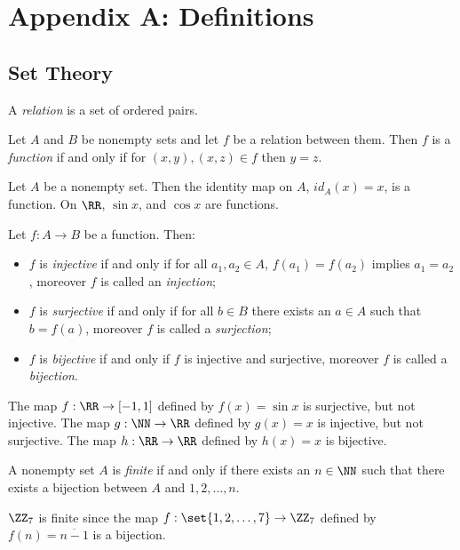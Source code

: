 
\chapter*{Appendix A: Definitions}

\section*{Set Theory}

\begin{definition*}
	A \textit{relation} is a set of ordered pairs.
\end{definition*}

\begin{definition*}
	Let $A$ and $B$ be nonempty sets and let $f$ be a relation between them. 
	Then $f$ is a \textit{function} if and only if for $(x,y),(x,z)\in f$ then $y=z$.
\end{definition*}
\begin{example*}
	Let $A$ be a nonempty set. 
	Then the identity map on $A$, $id_A(x)=x$, is a function.
	On $\RR$, $\sin x$, and $\cos x$ are functions.
\end{example*}

\begin{definition*}
	Let $f:A\rightarrow B$ be a function.
	Then:
	\begin{itemize}
		\item $f$ is \textit{injective} if and only if for all $a_1,a_2\in A$, $f(a_1)=f(a_2)$ implies $a_1=a_2$, moreover $f$ is called an \textit{injection};
		\item $f$ is \textit{surjective} if and only if for all $b\in B$ there exists an $a\in A$ such that $b=f(a)$, moreover $f$ is called a \textit{surjection};
		\item $f$ is \textit{bijective} if and only if $f$ is injective and surjective, moreover $f$ is called a \textit{bijection}.
	\end{itemize}
\end{definition*}
\begin{example*}
	The map $f:\RR\rightarrow[-1,1]$ defined by $f(x)=\sin x$ is surjective, but not injective.
	The map $g:\NN\rightarrow\RR$ defined by $g(x)=x$ is injective, but not surjective.
	The map $h:\RR\rightarrow\RR$ defined by $h(x)=x$ is bijective.
\end{example*}

\begin{definition*}
	A nonempty set $A$ is \textit{finite} if and only if there exists an $n\in\NN$ such that there exists a bijection between $A$ and ${1,2,\ldots, n}$.
\end{definition*}
\begin{example*}
	$\ZZ_7$ is finite since the map $f:\set{1,2,\ldots, 7}\rightarrow \ZZ_7$ defined by $f(n)=\overline{n-1}$ is a bijection.
\end{example*}

